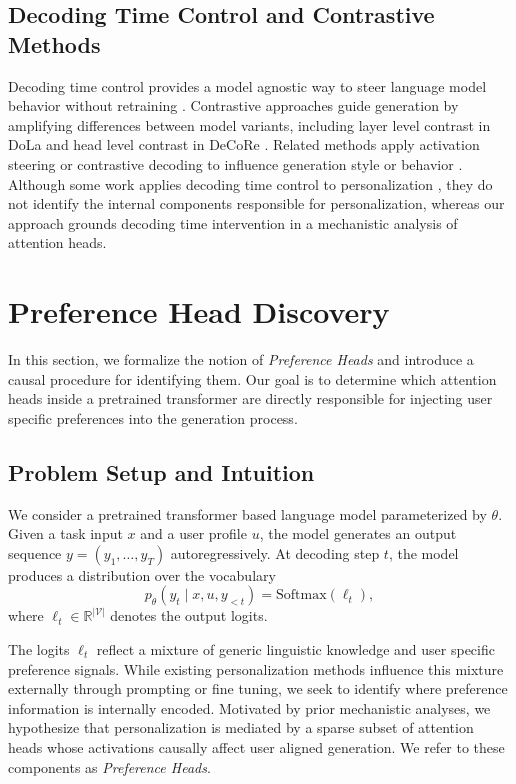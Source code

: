 \documentclass[11pt]{article}
\begin{document}
\subsection{Decoding Time Control and Contrastive Methods}

Decoding time control provides a model agnostic way to steer language model behavior without retraining \cite{opendecoder}.
Contrastive approaches guide generation by amplifying differences between model variants, including layer level contrast in DoLa \cite{DBLP:conf/iclr/ChuangXLKGH24} and head level contrast in DeCoRe \cite{DBLP:journals/corr/abs-2410-18860}.
Related methods apply activation steering or contrastive decoding to influence generation style or behavior \cite{DBLP:conf/acl/Zhang0WLWWC25,DBLP:conf/acl/WangXMDTC025}.
Although some work applies decoding time control to personalization \cite{DBLP:conf/iclr/ChenZLCL25}, they do not identify the internal components responsible for personalization, whereas our approach grounds decoding time intervention in a mechanistic analysis of attention heads.




\section{Preference Head Discovery}
\label{sec:preference-head-discovery}

In this section, we formalize the notion of \emph{Preference Heads} and introduce a causal procedure for identifying them.
Our goal is to determine which attention heads inside a pretrained transformer are directly responsible for injecting user specific preferences into the generation process.

\subsection{Problem Setup and Intuition}

We consider a pretrained transformer based language model parameterized by $\theta$.
Given a task input $x$ and a user profile $u$, the model generates an output sequence $y = (y_1, \ldots, y_T)$ autoregressively.
At decoding step $t$, the model produces a distribution over the vocabulary
\begin{equation}
p_\theta(y_t \mid x, u, y_{<t}) = \mathrm{Softmax}(\ell_t),
\end{equation}
where $\ell_t \in \mathbb{R}^{|\mathcal{V}|}$ denotes the output logits.

The logits $\ell_t$ reflect a mixture of generic linguistic knowledge and user specific preference signals.
While existing personalization methods influence this mixture externally through prompting or fine tuning, we seek to identify where preference information is internally encoded.
Motivated by prior mechanistic analyses, we hypothesize that personalization is mediated by a sparse subset of attention heads whose activations causally affect user aligned generation.
We refer to these components as \emph{Preference Heads}.
\end{document}

